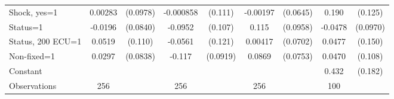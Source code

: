 \begin{tabular}{l|cccccc|cc}
Shock, yes=1    &  0.00283         & (0.0978)&-0.000858         &  (0.111)& -0.00197         & (0.0645)&    0.190         &  (0.125)\\
Status=1        &  -0.0196         & (0.0840)&  -0.0952         &  (0.107)&    0.115         & (0.0958)&  -0.0478         & (0.0970)\\
Status, 200 ECU=1&   0.0519         &  (0.110)&  -0.0561         &  (0.121)&  0.00417         & (0.0702)&   0.0477         &  (0.150)\\
Non-fixed=1     &   0.0297         & (0.0838)&   -0.117         & (0.0919)&   0.0869         & (0.0753)&   0.0470         &  (0.108)\\
Constant        &                  &         &                  &         &                  &         &    0.432\sym{**} &  (0.182)\\
\hline
Observations    &      256         &         &      256         &         &      256         &         &      100         &         \\


\end{tabular}
